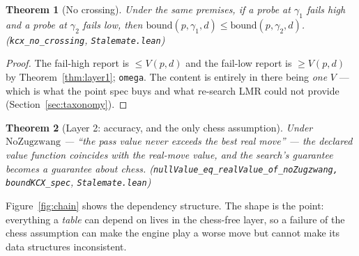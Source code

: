 \documentclass[11pt]{article}
\newcommand{\leanref}[2]{(\texttt{#1}, \texttt{#2})}%
\theoremstyle{plain}
\newtheorem{theorem}{Theorem}[section]
\theoremstyle{definition}
\theoremstyle{remark}
\begin{document}
\begin{theorem}[No crossing]
\label{thm:kcxnocross}
Under the same premises, if a probe at $\gamma_1$ fails high and a probe
at $\gamma_2$ fails low, then
$\mathrm{bound}(p,\gamma_1,d) \le \mathrm{bound}(p,\gamma_2,d)$.
\leanref{kcx\_no\_crossing}{Stalemate.lean}
\end{theorem}

\begin{proof}
The fail-high report is $\le V(p,d)$ and the fail-low report is
$\ge V(p,d)$ by Theorem~\ref{thm:layer1}; \texttt{omega}.  The content
is entirely in there being \emph{one} $V$ --- which is what the point
spec buys and what re-search LMR could not provide
(Section~\ref{sec:taxonomy}).
\end{proof}

\begin{theorem}[Layer 2: accuracy, and the only chess assumption]
Under $\mathrm{NoZugzwang}$ --- ``the pass value never exceeds the best
real move'' --- the declared value function coincides with the
real-move value, and the search's guarantee becomes a guarantee about
chess.
\leanref{nullValue\_eq\_realValue\_of\_noZugzwang, boundKCX\_spec}{Stalemate.lean}
\end{theorem}

Figure~\ref{fig:chain} shows the dependency structure.  The shape is
the point: everything a \emph{table} can depend on lives in the
chess-free layer, so a failure of the chess assumption can make the
engine play a worse move but cannot make its data structures
inconsistent.
\end{document}
